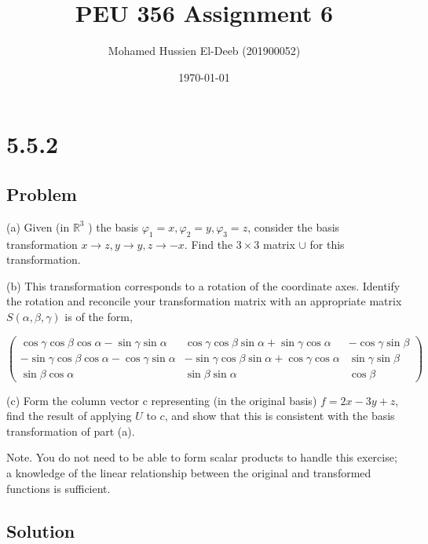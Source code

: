 \documentclass[12pt]{article}
\title{PEU 356 Assignment 6}
\author{Mohamed Hussien El-Deeb (201900052)}
\date{\today}
\begin{document}
\maketitle
\tableofcontents
\hypersetup{linkcolor=RoyalBlue4}

\newpage
\section{5.5.2}

\subsection{Problem}

(a) Given (in \(\mathbb{R}^3\) ) the basis \(\varphi_1=x, \varphi_2=y, \varphi_3=z\), consider the basis transformation \(x \rightarrow z, y \rightarrow y, z \rightarrow-x\). Find the \(3 \times 3\) matrix \(\cup \) for this transformation.

(b) This transformation corresponds to a rotation of the coordinate axes. Identify the rotation and reconcile your transformation matrix with an appropriate matrix \(S(\alpha, \beta, \gamma)\) is of the form,

\[
    \begin{pmatrix}
        \cos \gamma \cos \beta \cos \alpha-\sin \gamma \sin \alpha  & \cos \gamma \cos \beta \sin \alpha+\sin \gamma \cos \alpha  & -\cos \gamma \sin \beta \\
        -\sin \gamma \cos \beta \cos \alpha-\cos \gamma \sin \alpha & -\sin \gamma \cos \beta \sin \alpha+\cos \gamma \cos \alpha & \sin \gamma \sin \beta  \\
        \sin \beta \cos \alpha                                      & \sin \beta \sin \alpha                                      & \cos \beta
    \end{pmatrix}
\]

(c) Form the column vector c representing (in the original basis) \(f=2 x-3 y+z\), find the result of applying \(U\) to \(c\), and show that this is consistent with the basis transformation of part (a).

Note. You do not need to be able to form scalar products to handle this exercise; a knowledge of the linear relationship between the original and transformed functions is sufficient.

\subsection{Solution}
\end{document}
